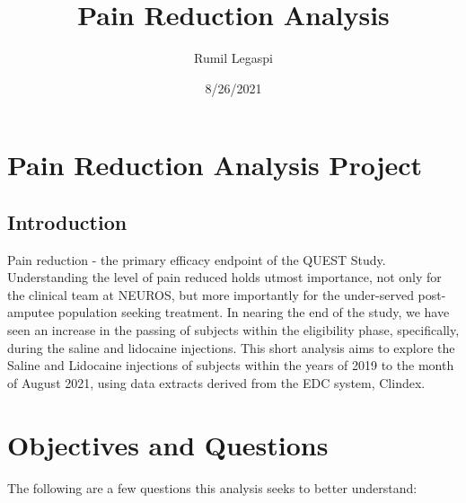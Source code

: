 \documentclass[
]{article}
\title{Pain Reduction Analysis}
\author{Rumil Legaspi}
\date{8/26/2021}
\begin{document}
\maketitle

\hypertarget{pain-reduction-analysis-project}{%
\section{Pain Reduction Analysis
Project}\label{pain-reduction-analysis-project}}

\hypertarget{introduction}{%
\subsection{Introduction}\label{introduction}}

Pain reduction - the primary efficacy endpoint of the QUEST Study.
Understanding the level of pain reduced holds utmost importance, not
only for the clinical team at NEUROS, but more importantly for the
under-served post-amputee population seeking treatment. In nearing the
end of the study, we have seen an increase in the passing of subjects
within the eligibility phase, specifically, during the saline and
lidocaine injections. This short analysis aims to explore the Saline and
Lidocaine injections of subjects within the years of 2019 to the month
of August 2021, using data extracts derived from the EDC system,
Clindex.

\hypertarget{objectives-and-questions}{%
\section{Objectives and Questions}\label{objectives-and-questions}}

The following are a few questions this analysis seeks to better
understand:
\end{document}
